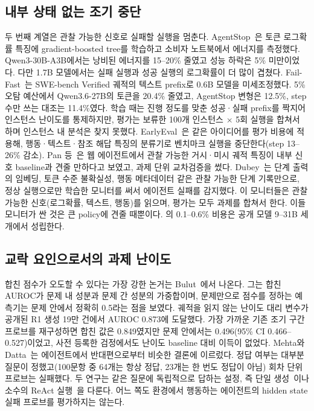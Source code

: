 \documentclass[11pt]{article}
\begin{document}
\subsection{내부 상태 없는 조기 중단}
두 번째 계열은 관찰 가능한 신호로 실패할 실행을 멈춘다. AgentStop~\cite{pham2026agentstop}은 토큰 로그확률 특징에 gradient-boosted tree를 학습하고 소비자 노트북에서 에너지를 측정했다.
Qwen3-30B-A3B에서는 낭비된 에너지를 15--20\% 줄였고 성능 하락은 5\% 미만이었다. 다만 1.7B 모델에서는 실패 실행과 성공 실행의 로그확률이 더 많이 겹쳤다.
Fail-Fast~\cite{wang2026failfast}는 SWE-bench Verified 궤적의 텍스트 prefix로 0.6B 모델을 미세조정했다. 5\% 오탐 예산에서 Qwen3.6-27B의 토큰을 20.4\% 줄였고, AgentStop 변형은 12.5\%, step 수만 쓰는 대조는 11.4\%였다.
학습 때는 진행 정도를 맞춘 성공·실패 prefix를 짝지어 인스턴스 난이도를 통제하지만, 평가는 보류한 100개 인스턴스 $\times$ 5회 실행을 합쳐서 하며 인스턴스 내 분석은 찾지 못했다.
EarlyEval~\cite{shi2026earlyeval}은 같은 아이디어를 평가 비용에 적용해, 행동·텍스트·참조 해답 특징의 분류기로 벤치마크 실행을 중단한다(step 13--26\% 감소).
Pan 등~\cite{pan2026monitoring}은 웹 에이전트에서 관찰 가능한 거시·미시 궤적 특징이 내부 신호 baseline과 견줄 만하다고 보였고, 과제 단위 교차검증을 썼다. Dubey~\cite{dubey2026realtime}는 단계 출력의 임베딩, 토큰 수준 불확실성, 행동 메타데이터 같은 관찰 가능한 단계 기록만으로, 정상 실행으로만 학습한 모니터를 써서 에이전트 실패를 감지했다.
이 모니터들은 관찰 가능한 신호(로그확률, 텍스트, 행동)를 읽으며, 평가는 모두 과제를 합쳐서 한다. 이들 모니터가 싼 것은 큰 policy에 견줄 때뿐이다. \cite{wang2026failfast}의 0.1--0.6\% 비용은 공개 모델 9--31B 세 개에서 성립한다.

\subsection{교락 요인으로서의 과제 난이도}
합친 점수가 오도할 수 있다는 가장 강한 논거는 Bulut~\cite{bulut2026problem}에서 나온다. 그는 합친 AUROC가 문제 내 성분과 문제 간 성분의 가중합이며, 문제만으로 점수를 정하는 예측기는 문제 안에서 정확히 0.5라는 점을 보였다.
궤적을 읽지 않는 난이도 대리 변수가 공개된 R1 생성 19만 건에서 AUROC 0.873에 도달했다. 가장 가까운 기존 조기 구간 프로브를 재구성하면 합친 값은 0.849였지만 문제 안에서는 0.496(95\% CI 0.466--0.527)이었고, 사전 등록한 검정에서도 난이도 baseline 대비 이득이 없었다.
Mehta와 Datta~\cite{mehta2026commit}는 에이전트에서 반대편으로부터 비슷한 결론에 이르렀다. 정답 여부는 대부분 질문이 정했고(100문항 중 64개는 항상 정답, 23개는 한 번도 정답이 아님) 회차 단위 프로브는 실패했다.
두 연구는 같은 질문에 독립적으로 답하는 설정, 즉 단일 생성~\cite{bulut2026problem}이나 소수의 ReAct 실행~\cite{mehta2026commit}을 다룬다. 어느 쪽도 환경에서 행동하는 에이전트의 hidden state 실패 프로브를 평가하지는 않는다.
\end{document}
